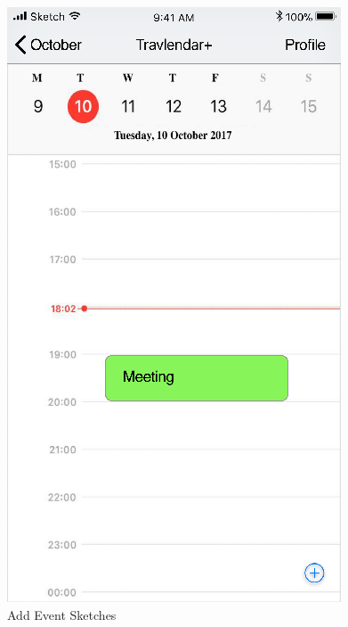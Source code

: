 \begin{figure}[H]
	\hspace{0.5cm}
	\includegraphics[scale=0.23]{Images/Interface/Calendar/4_calendar+meeting}
	\caption{Add Event Sketches}
\end{figure}

